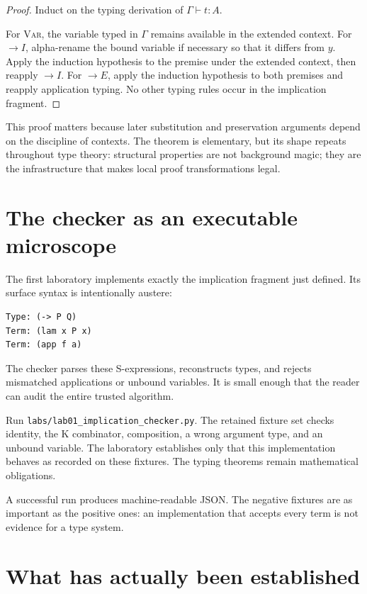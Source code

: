 \begin{proof}
Induct on the typing derivation of $\Gamma\vdash t:A$.

For \textsc{Var}, the variable typed in $\Gamma$ remains available in the extended context. For $\to I$, alpha-rename the bound variable if necessary so that it differs from $y$. Apply the induction hypothesis to the premise under the extended context, then reapply $\to I$. For $\to E$, apply the induction hypothesis to both premises and reapply application typing. No other typing rules occur in the implication fragment.
\end{proof}

This proof matters because later substitution and preservation arguments depend on the discipline of contexts. The theorem is elementary, but its shape repeats throughout type theory: structural properties are not background magic; they are the infrastructure that makes local proof transformations legal.

\section{The checker as an executable microscope}

The first laboratory implements exactly the implication fragment just defined. Its surface syntax is intentionally austere:

\begin{verbatim}
Type: (-> P Q)
Term: (lam x P x)
Term: (app f a)
\end{verbatim}

The checker parses these S-expressions, reconstructs types, and rejects mismatched applications or unbound variables. It is small enough that the reader can audit the entire trusted algorithm.

\begin{labbox}
Run \texttt{labs/lab01\_implication\_checker.py}. The retained fixture set checks identity, the K combinator, composition, a wrong argument type, and an unbound variable. The laboratory establishes only that this implementation behaves as recorded on these fixtures. The typing theorems remain mathematical obligations.
\end{labbox}

A successful run produces machine-readable JSON. The negative fixtures are as important as the positive ones: an implementation that accepts every term is not evidence for a type system.

\section{What has actually been established}

